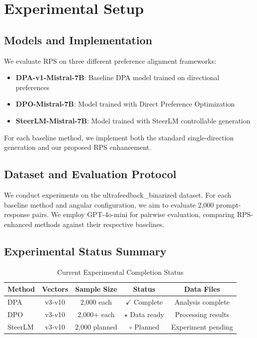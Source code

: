 \documentclass{article} %
\begin{document}
\section{Experimental Setup}

\subsection{Models and Implementation}
We evaluate RPS on three different preference alignment frameworks:

\begin{itemize}
    \item \textbf{DPA-v1-Mistral-7B}: Baseline DPA model trained on directional preferences
    \item \textbf{DPO-Mistral-7B}: Model trained with Direct Preference Optimization  
    \item \textbf{SteerLM-Mistral-7B}: Model trained with SteerLM controllable generation
\end{itemize}

For each baseline method, we implement both the standard single-direction generation and our proposed RPS enhancement.

\subsection{Dataset and Evaluation Protocol}
We conduct experiments on the ultrafeedback\_binarized dataset. For each baseline method and angular configuration, we aim to evaluate 2,000 prompt-response pairs. We employ GPT-4o-mini for pairwise evaluation, comparing RPS-enhanced methods against their respective baselines.

\subsection{Experimental Status Summary}

\begin{table}[t]
\centering
\caption{Current Experimental Completion Status}
\label{tab:experimental_status}
\begin{tabular}{l|c|c|c|c}
\toprule
\textbf{Method} & \textbf{Vectors} & \textbf{Sample Size} & \textbf{Status} & \textbf{Data Files} \\
\midrule
DPA & v3-v10 & 2,000 each & $\checkmark$ \textcolor[HTML]{2878b5}{Complete} & Analysis complete \\
DPO & v3-v10 & 2,000+ each & $\star$ \textcolor[HTML]{f8ac8c}{Data ready} & Processing results \\
SteerLM & v3-v10 & 2,000 planned & $\circ$ \textcolor[HTML]{ff8884}{Planned} & Experiment pending \\
\bottomrule
\end{tabular}
\end{table}
\end{document}
